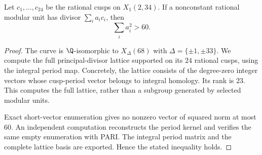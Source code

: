 \begin{lemma}\label{lem:decic234-short-units}
Let $c_1,\ldots,c_{24}$ be the rational cusps on $X_1(2,34)$.
If a nonconstant rational modular unit has divisor
$\sum_i a_i c_i$, then
\[
 \sum_i a_i^2>60.
\]
\end{lemma}
\begin{proof}
The curve is $\Q$-isomorphic to $X_\Delta(68)$ with
$\Delta=\{\pm1,\pm33\}$.
We compute the full principal-divisor lattice supported on its
$24$ rational cusps, using the integral period map.
Concretely, the lattice consists of the degree-zero integer vectors
whose cusp-period vector belongs to integral homology.
Its rank is $23$. This computes the full lattice, rather than a
subgroup generated by selected modular units.

Exact short-vector enumeration gives no nonzero vector of squared
norm at most $60$. An independent computation reconstructs the
period kernel and verifies the same empty enumeration with PARI.
The integral period matrix and the complete lattice basis are
exported. Hence the stated inequality holds.
\end{proof}

